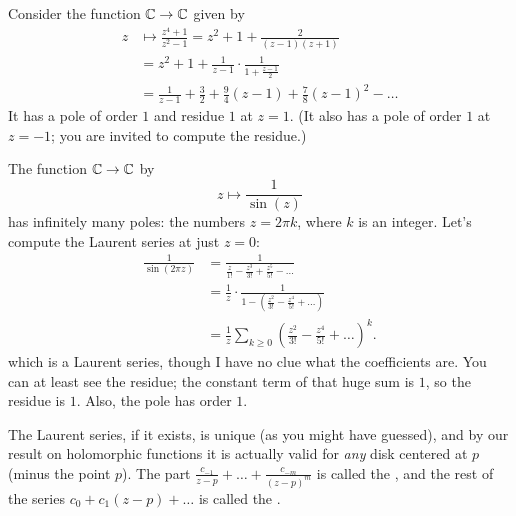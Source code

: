 \begin{example}
	Consider the function $\mathbb C \to \mathbb C$ given by
	\begin{align*}
		z &\mapsto \frac{z^4+1}{z^2-1} = z^2 + 1 + \frac{2}{(z-1)(z+1)} \\
		&= z^2 + 1 + \frac1{z-1} \cdot \frac{1}{1+\frac{z-1}{2}} \\
		&= \frac{1}{z-1} + \frac32 + \frac94(z-1) + \frac{7}{8}(z-1)^2 - \dots
	\end{align*}
	It has a pole of order $1$ and residue $1$ at $z=1$.
	(It also has a pole of order $1$ at $z=-1$; you are invited to compute the residue.)
\end{example}
\begin{example}
	The function $\mathbb C \to \mathbb C$ by \[ z \mapsto \frac{1}{\sin(z)} \]
	has infinitely many poles: the numbers $z = 2\pi k$, where $k$ is an integer.
	Let's compute the Laurent series at just $z=0$:
	\begin{align*}
		\frac{1}{\sin(2\pi z)}
		&= \frac{1}{\frac{z}{1!} - \frac{z^3}{3!} + \frac{z^5}{5!} - \dots} \\
		&= \frac 1z \cdot \frac{1}{1 - \left( \frac{z^2}{3!} - \frac{z^4}{5!} + \dots \right)} \\
		&= \frac 1z \sum_{k \ge 0} \left( \frac{z^2}{3!} - \frac{z^4}{5!} + \dots \right)^k.
	\end{align*}
	which is a Laurent series, though I have no clue what the coefficients are.
	You can at least see the residue; the constant term of that huge sum is $1$,
	so the residue is $1$.
	Also, the pole has order $1$.
\end{example}

The Laurent series, if it exists, is unique (as you might have guessed),
and by our result on holomorphic functions it is actually valid for \emph{any}
disk centered at $p$ (minus the point $p$).
The part $\frac{c_{-1}}{z-p} + \dots + \frac{c_{-m}}{(z-p)^m}$ is called the ,
and the rest of the series $c_0 + c_1(z-p) + \dots$ is called the .



